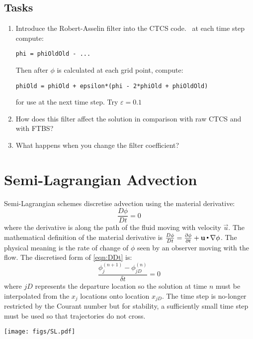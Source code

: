 \subsection{Tasks}
\begin{enumerate}
\item Introduce the Robert-Asselin filter into the CTCS code. \ie\ at each time step compute:
\begin{verbatim}
phi = phiOldOld - ...
\end{verbatim}
Then after $\phi$ is calculated at each grid point, compute:
\begin{verbatim}
phiOld = phiOld + epsilon*(phi - 2*phiOld + phiOldOld)
\end{verbatim}
for use at the next time step. Try  $\varepsilon=0.1$
\item How does this filter affect the solution in comparison with raw CTCS and with FTBS?
\item What happens when you change the filter coefficient?
\end{enumerate}

\clearpage
\section{Semi-Lagrangian Advection}

Semi-Lagrangian schemes discretise advection using the material derivative:
\begin{equation}
\frac{D\phi}{Dt} = 0
\label{eqn:DDt}
\end{equation}
where the derivative is along the path of the fluid moving with velocity $\vec{u}$. The mathematical definition of  the material derivative is $\frac{D\phi}{Dt}=\frac{\partial\phi}{\partial t} + \mathbf u\,{\scriptscriptstyle \stackrel{\bullet}{{}}}\,\nabla\phi$. The physical meaning is the rate of change of $\phi$ seen by an observer moving with the flow. The discretised form of \ref{eqn:DDt} is:
\begin{equation}
\frac{\phi^{(n+1)}_j - \phi^{(n)}_{jD}}{\delta t} = 0
\end{equation}
where $jD$ represents the departure location so the solution at time $n$ must be interpolated from the $x_j$ locations onto location $x_{jD}$. The time step is no-longer restricted by the Courant number but for stability, a sufficiently small time step must be used so that trajectories do not cross. 

\begin{center}
\texttt{[image: figs/SL.pdf]}
\end{center}

